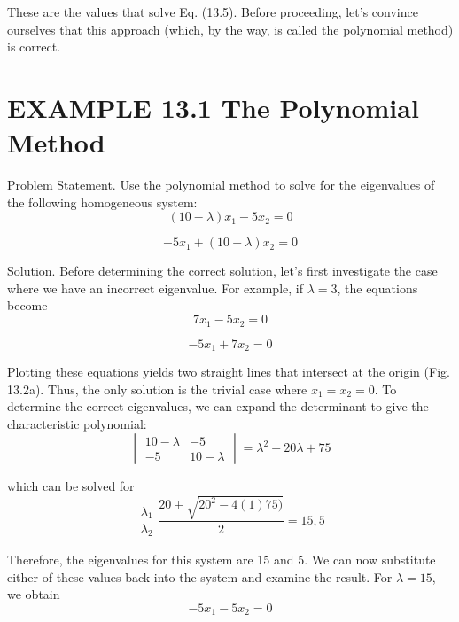 \documentclass[../main.tex]{subfiles}
\begin{document}
These are the values that solve Eq. (13.5). Before proceeding, let’s convince ourselves that
this approach (which, by the way, is called the polynomial method) is correct.


\section*{EXAMPLE 13.1 The Polynomial Method}

Problem Statement. Use the polynomial method to solve for the eigenvalues of the following homogeneous system:
\begin{equation}
(10-\lambda )x_{1}-5x_{2}=0
\end{equation}

\begin{equation}
-5x_{1}+(10-\lambda )x_{2}=0
\end{equation}

Solution. Before determining the correct solution, let’s first investigate the case where
we have an incorrect eigenvalue. For example, if $\lambda = 3$, the equations become
\begin{equation}
7x_{1}-5x_{2}=0
\end{equation}

\begin{equation}
-5x_{1}+7x_{2}=0
\end{equation}

Plotting these equations yields two straight lines that intersect at the origin (Fig. 13.2a).
Thus, the only solution is the trivial case where $x_{1} = x_{2} = 0$.
To determine the correct eigenvalues, we can expand the determinant to give the characteristic polynomial:
\begin{equation}
\begin{vmatrix}
10-\lambda  &-5 \\
-5 & 10-\lambda
\end{vmatrix}
=\lambda ^{2}-20\lambda +75
\end{equation}

which can be solved for
\begin{equation}
\begin{matrix}
\lambda _{1}\\
\lambda _{2}
\end{matrix}
\frac{20\pm \sqrt{20^{2}-4(1)75)}}{2}=15,5
\end{equation}

Therefore, the eigenvalues for this system are 15 and 5.
We can now substitute either of these values back into the system and examine the result. For $\lambda = 15$, we obtain
\begin{equation}
-5x_{1}-5x_{2}=0
\end{equation}
\end{document}
